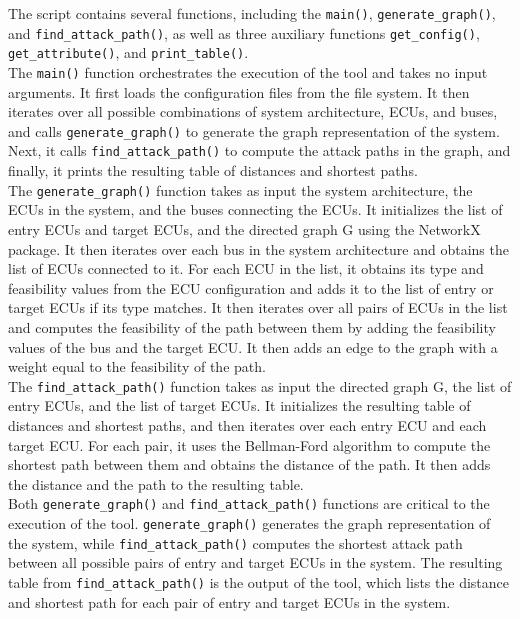 The script contains several functions, including the \texttt{main()}, \texttt{generate\_graph()}, and \texttt{find\_attack\_path()}, 
as well as three auxiliary functions \texttt{get\_config()}, \texttt{get\_attribute()}, and \texttt{print\_table()}. \\

The \texttt{main()} function orchestrates the execution of the tool and takes no input arguments. 
It first loads the configuration files from the file system. 
It then iterates over all possible combinations of system architecture, ECUs, and buses, and calls \texttt{generate\_graph()} to generate the graph representation of the system. 
Next, it calls \texttt{find\_attack\_path()} to compute the attack paths in the graph, and finally, it prints the resulting table of distances and shortest paths.\\

The \texttt{generate\_graph()} function takes as input the system architecture, 
the ECUs in the system, and the buses connecting the ECUs. It initializes the list of entry ECUs and target ECUs, and the directed graph G using the NetworkX package. 
It then iterates over each bus in the system architecture and obtains the list of ECUs connected to it. 
For each ECU in the list, it obtains its type and feasibility values from the ECU configuration and adds it to the list of entry or target ECUs if its type matches. 
It then iterates over all pairs of ECUs in the list and computes the feasibility of the path between them by adding the feasibility values of the bus and the target ECU. 
It then adds an edge to the graph with a weight equal to the feasibility of the path.\\

The \texttt{find\_attack\_path()} function takes as input the directed graph G, the list of entry ECUs, and the list of target ECUs. 
It initializes the resulting table of distances and shortest paths, and then iterates over each entry ECU and each target ECU. 
For each pair, it uses the Bellman-Ford algorithm to compute the shortest path between them and obtains the distance of the path. 
It then adds the distance and the path to the resulting table.\\

Both \texttt{generate\_graph()} and \texttt{find\_attack\_path()} functions are critical to the execution of the tool. 
\texttt{generate\_graph()} generates the graph representation of the system, while \texttt{find\_attack\_path()} computes the shortest attack path between all possible pairs of entry and target ECUs in the system. 
The resulting table from \texttt{find\_attack\_path()} is the output of the tool, which lists the distance and shortest path for each pair of entry and target ECUs in the system.